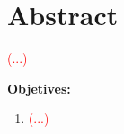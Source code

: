 \section*{Abstract}

\textcolor{red}{(...)}

\textbf{Objetives:}
\begin{enumerate}
    \item \textcolor{red}{(...)}
\end{enumerate}
